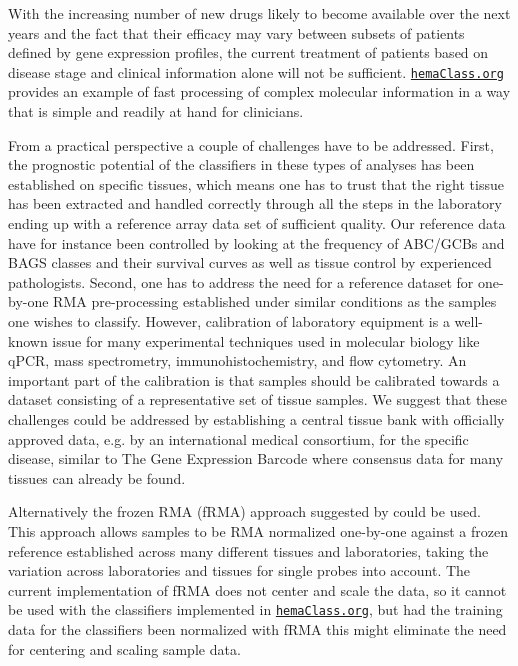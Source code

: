 \documentclass[10pt,letterpaper]{article}
\newcommand{\hemaClass}{\href{http://hemaClass.org}{\texttt{hemaClass.org}}}
\begin{document}
With the increasing number of new drugs likely to become available over the next years and the fact that their efficacy may vary between subsets of patients defined by gene expression profiles, the current treatment of patients based on disease stage and clinical information alone will not be sufficient.
\hemaClass{} provides an example of fast processing of complex molecular information in a way that is simple and readily at hand for clinicians.

From a practical perspective a couple of challenges have to be addressed. First, the prognostic potential of the classifiers in these types of analyses has been established on specific tissues, which means one has to trust that the right tissue has been extracted and handled correctly through all the steps in the laboratory ending up with a reference array data set of sufficient quality. Our reference data have for instance been controlled by looking at the frequency of ABC/GCBs and BAGS classes and their survival curves as well as tissue control by experienced pathologists. Second, one has to address the need for a reference dataset for one-by-one RMA pre-processing established under similar conditions as the samples one wishes to classify. However, calibration of laboratory equipment is a well-known issue for many experimental techniques used in molecular biology like qPCR, mass spectrometry, immunohistochemistry, and flow cytometry. An important part of the calibration is that samples should be calibrated towards a dataset consisting of a representative set of tissue samples. We suggest that these challenges could be addressed by establishing a central tissue bank with officially approved data, e.g. by an international medical consortium, for the specific disease, similar to The Gene Expression Barcode \mbox{\cite{McCall2014}} where consensus data for many tissues can already be found.

Alternatively the frozen RMA (fRMA) approach suggested by \mbox{\cite{McCall2010}} could be used. This approach allows samples to be RMA normalized one-by-one against a frozen reference established across many different tissues and laboratories, taking the variation across laboratories and tissues for single probes into account. The current implementation of fRMA does not center and scale the data, so it cannot be used with the classifiers implemented in \hemaClass{}, but had the training data for the classifiers been normalized with fRMA this might eliminate the need for centering and scaling sample data.
\end{document}
